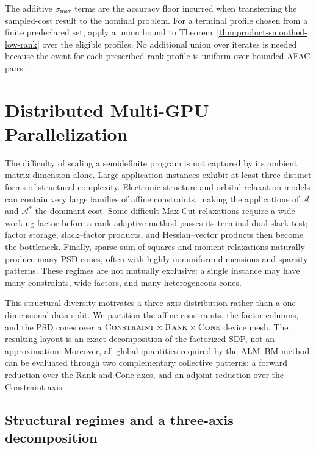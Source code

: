 \documentclass[11pt]{article}
\theoremstyle{definition}
\theoremstyle{remark}
\begin{document}
The additive $\sigma_{\max}$ terms are the accuracy floor incurred when
transferring the sampled-cost result to the nominal problem.  For a terminal
profile chosen from a finite predeclared set, apply a union bound to
Theorem~\ref{thm:product-smoothed-low-rank} over the eligible profiles.  No
additional union over iterates is needed because the event for each prescribed
rank profile is uniform over bounded AFAC pairs.

%
%

\section{Distributed Multi-GPU Parallelization}
\label{sec:distributed-multigpu}

The difficulty of scaling a semidefinite program is not captured by its
ambient matrix dimension alone.  Large application instances exhibit at
least three distinct forms of structural complexity.  Electronic-structure
and orbital-relaxation models can contain very large families of
affine constraints, making the applications of $\mathcal A$ and
$\mathcal A^*$ the dominant cost.  Some difficult Max-Cut relaxations require
a wide working factor before a rank-adaptive method passes its terminal
dual-slack test; factor storage,
slack--factor products, and Hessian--vector products then become the
bottleneck.
Finally, sparse sum-of-squares and moment relaxations naturally produce many
PSD cones, often with highly nonuniform dimensions and sparsity patterns.
These regimes are not mutually exclusive: a single instance may have many
constraints, wide factors, and many heterogeneous cones.

This structural diversity motivates a three-axis distribution rather than a
one-dimensional data split.  We partition the affine constraints, the factor
columns, and the PSD cones over a
$\textsc{Constraint}\times\textsc{Rank}\times\textsc{Cone}$ device mesh.  The
resulting layout is an exact decomposition of the factorized SDP, not an
approximation.  Moreover, all global quantities required by the ALM--BM
method can be evaluated through two complementary collective patterns: a
forward reduction over the Rank and Cone axes, and an adjoint reduction over
the Constraint axis.

\subsection{Structural regimes and a three-axis decomposition}
\label{subsec:three-axis-decomposition}
\end{document}
